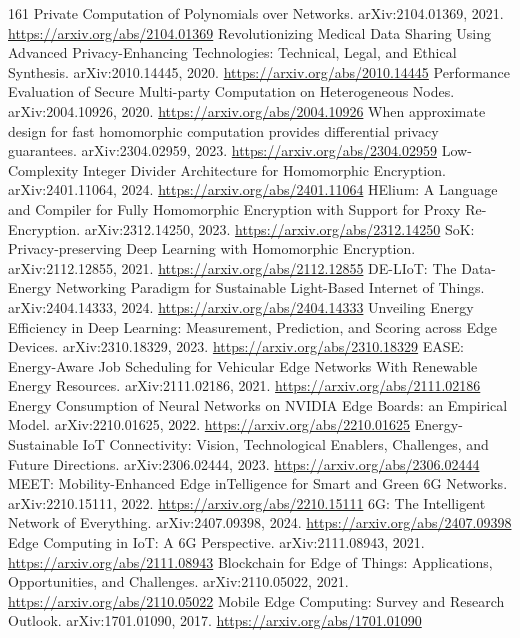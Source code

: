 \documentclass[11pt]{article}
\begin{document}
\begin{thebibliography}{161}
 Private Computation of Polynomials over Networks. arXiv:2104.01369, 2021. \url{https://arxiv.org/abs/2104.01369}
 Revolutionizing Medical Data Sharing Using Advanced Privacy-Enhancing Technologies: Technical, Legal, and Ethical Synthesis. arXiv:2010.14445, 2020. \url{https://arxiv.org/abs/2010.14445}
 Performance Evaluation of Secure Multi-party Computation on Heterogeneous Nodes. arXiv:2004.10926, 2020. \url{https://arxiv.org/abs/2004.10926}
 When approximate design for fast homomorphic computation provides differential privacy guarantees. arXiv:2304.02959, 2023. \url{https://arxiv.org/abs/2304.02959}
 Low-Complexity Integer Divider Architecture for Homomorphic Encryption. arXiv:2401.11064, 2024. \url{https://arxiv.org/abs/2401.11064}
 HElium: A Language and Compiler for Fully Homomorphic Encryption with Support for Proxy Re-Encryption. arXiv:2312.14250, 2023. \url{https://arxiv.org/abs/2312.14250}
 SoK: Privacy-preserving Deep Learning with Homomorphic Encryption. arXiv:2112.12855, 2021. \url{https://arxiv.org/abs/2112.12855}
 DE-LIoT: The Data-Energy Networking Paradigm for Sustainable Light-Based Internet of Things. arXiv:2404.14333, 2024. \url{https://arxiv.org/abs/2404.14333}
 Unveiling Energy Efficiency in Deep Learning: Measurement, Prediction, and Scoring across Edge Devices. arXiv:2310.18329, 2023. \url{https://arxiv.org/abs/2310.18329}
 EASE: Energy-Aware Job Scheduling for Vehicular Edge Networks With Renewable Energy Resources. arXiv:2111.02186, 2021. \url{https://arxiv.org/abs/2111.02186}
 Energy Consumption of Neural Networks on NVIDIA Edge Boards: an Empirical Model. arXiv:2210.01625, 2022. \url{https://arxiv.org/abs/2210.01625}
 Energy-Sustainable IoT Connectivity: Vision, Technological Enablers, Challenges, and Future Directions. arXiv:2306.02444, 2023. \url{https://arxiv.org/abs/2306.02444}
 MEET: Mobility-Enhanced Edge inTelligence for Smart and Green 6G Networks. arXiv:2210.15111, 2022. \url{https://arxiv.org/abs/2210.15111}
 6G: The Intelligent Network of Everything. arXiv:2407.09398, 2024. \url{https://arxiv.org/abs/2407.09398}
 Edge Computing in IoT: A 6G Perspective. arXiv:2111.08943, 2021. \url{https://arxiv.org/abs/2111.08943}
 Blockchain for Edge of Things: Applications, Opportunities, and Challenges. arXiv:2110.05022, 2021. \url{https://arxiv.org/abs/2110.05022}
 Mobile Edge Computing: Survey and Research Outlook. arXiv:1701.01090, 2017. \url{https://arxiv.org/abs/1701.01090}

\end{thebibliography}
\end{document}
